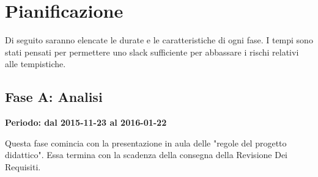 \documentclass[../PianoProgetto.tex]{subfiles}
\begin{document}
\section{Pianificazione}

	Di seguito saranno elencate le durate e le caratteristiche di ogni fase. I tempi sono stati pensati per permettere uno slack sufficiente per abbassare i rischi relativi alle tempistiche.
	
	\subsection{Fase A: Analisi}
	
	\textbf{Periodo: dal 2015-11-23 al 2016-01-22}

	Questa fase comincia con la presentazione in aula delle "regole del progetto didattico". Essa termina con la scadenza della consegna della Revisione Dei Requisiti.
\end{document}
